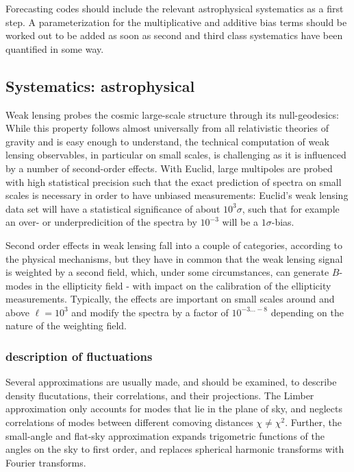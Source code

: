 Forecasting codes should include the relevant astrophysical systematics as a first step. A parameterization for the multiplicative and additive bias terms should be worked out to be added as soon as second and third class systematics have been quantified in some way.




\subsection{Systematics: astrophysical}
\label{sec:lensing_systematics}

Weak lensing probes the cosmic large-scale structure through its null-geodesics: While this property follows almost universally from all relativistic theories of gravity and is easy enough to understand, the technical computation of weak lensing observables, in particular on small scales, is challenging as it is influenced by a number of second-order effects. With Euclid, large multipoles are probed with high statistical precision such that the exact prediction of spectra on small scales is necessary in order to have unbiased measurements: Euclid's weak lensing data set will have a statistical significance of about $10^3\sigma$, such that for example an over- or underpredicition of the spectra by $10^{-3}$ will be a $1\sigma$-bias.

Second order effects in weak lensing fall into a couple of categories, according to the physical mechanisms, but they have in common that the weak lensing signal is weighted by a second field, which, under some circumstances, can generate $B$-modes in the ellipticity field - with impact on the calibration of the ellipticity measurements. Typically, the effects are important on small scales around and above $\ell=10^3$ and modify the spectra by a factor of $10^{-3\ldots-8}$ depending on the nature of the weighting field.

\subsubsection{description of fluctuations}

Several approximations are usually made, and should be examined, to describe density flucutations, their correlations, and their projections.
The Limber approximation \cite{1953ApJ...117..134L,1992ApJ...388..272K} only accounts for modes that lie in the plane of sky, and neglects
correlations of modes between different comoving distances $\chi \ne \chi^2$. Further, the small-angle and flat-sky approximation
expands trigometric functions of the angles on the sky to first order, and replaces spherical harmonic transforms with Fourier transforms.

